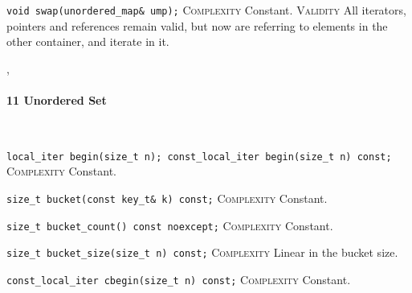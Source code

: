 \noindent{}\hspace*{0.25em}\lstinline[basicstyle=\ttfamily\color{cgreen}]{void swap(unordered_map& ump);} \textsc{Complexity} Constant. \textsc{Validity} All iterators, pointers and references remain valid, but now are referring to elements in the other container, and iterate in it.\\\vspace{-0.6em}


\sep
{}
\paragraph{11 Unordered Set}\mbox{}\vspace{0.5em}\\
\noindent{}\hspace*{0.25em}\lstinline[basicstyle=\ttfamily\color{cgreen}]{local_iter begin(size_t n); const_local_iter begin(size_t n) const;} \textsc{Complexity} Constant.\\\vspace{-0.6em}

\noindent{}\hspace*{0.25em}\lstinline[basicstyle=\ttfamily\color{cgreen}]{size_t bucket(const key_t& k) const;} \textsc{Complexity} Constant.\\\vspace{-0.6em}

\noindent{}\hspace*{0.25em}\lstinline[basicstyle=\ttfamily\color{cgreen}]{size_t bucket_count() const noexcept;} \textsc{Complexity} Constant.\\\vspace{-0.6em}

\noindent{}\hspace*{0.25em}\lstinline[basicstyle=\ttfamily\color{corange}]{size_t bucket_size(size_t n) const;} \textsc{Complexity} Linear in the bucket size.\\\vspace{-0.6em}

\noindent{}\hspace*{0.25em}\lstinline[basicstyle=\ttfamily\color{cgreen}]{const_local_iter cbegin(size_t n) const;} \textsc{Complexity} Constant.\\\vspace{-0.6em}

